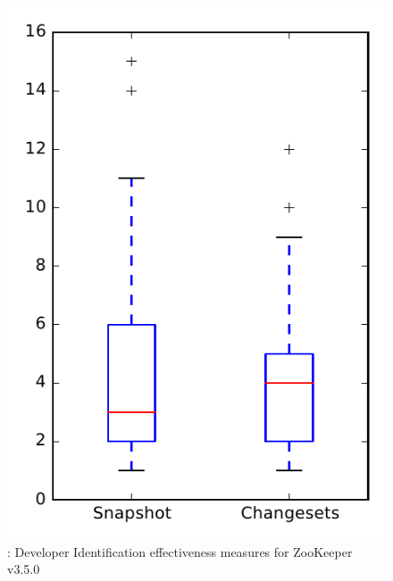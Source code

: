 
\begin{figure}
\centering
\includegraphics[height=0.4\textheight]{figures/dit/rq1_zookeeper}
\caption{\done: Developer Identification effectiveness measures for ZooKeeper v3.5.0}
\label{fig:dit:rq1:zookeeper}
\end{figure}
